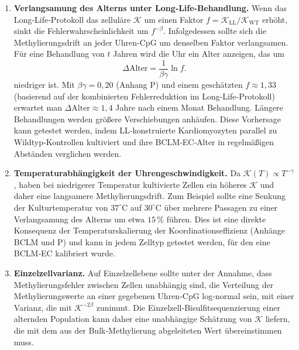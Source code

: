 \documentclass[12pt,a4paper]{article}
\newcommand{\REL}{\mathcal{K}}          %
\begin{document}
	\begin{enumerate}
		\item \textbf{Verlangsamung des Alterns unter Long‑Life‑Behandlung.}
		Wenn das Long‑Life‑Protokoll das zelluläre \(\REL\) um einen Faktor \(f = \REL_{\mathrm{LL}}/\REL_{\mathrm{WT}}\) erhöht, sinkt die Fehlerwahrscheinlichkeit um \(f^{-\beta}\). Infolgedessen sollte sich die Methylierungsdrift an jeder Uhren‑CpG um denselben Faktor verlangsamen. Für eine Behandlung von \(t\) Jahren wird die Uhr ein Alter anzeigen, das um
		\[
		\Delta\mathrm{Alter} = \frac{1}{\beta\gamma} \ln f.
		\]
		niedriger ist. Mit \(\beta\gamma = 0,20\) (Anhang P) und einem geschätzten \(f \approx 1,33\) (basierend auf der kombinierten Fehlerreduktion im Long‑Life‑Protokoll) erwartet man \(\Delta\mathrm{Alter} \approx 1,4\) Jahre nach einem Monat Behandlung. Längere Behandlungen werden größere Verschiebungen anhäufen. Diese Vorhersage kann getestet werden, indem LL‑konstruierte Kardiomyozyten parallel zu Wildtyp‑Kontrollen kultiviert und ihre BCLM‑EC‑Alter in regelmäßigen Abständen verglichen werden.
		
		\item \textbf{Temperaturabhängigkeit der Uhrengeschwindigkeit.}
		Da \(\REL(T) \propto T^{-\gamma}\), haben bei niedrigerer Temperatur kultivierte Zellen ein höheres \(\REL\) und daher eine langsamere Methylierungsdrift. Zum Beispiel sollte eine Senkung der Kulturtemperatur von \(37^\circ\text{C}\) auf \(30^\circ\text{C}\) über mehrere Passagen zu einer Verlangsamung des Alterns um etwa \(15\,\%\) führen. Dies ist eine direkte Konsequenz der Temperaturskalierung der Koordinationseffizienz (Anhänge BCLM und P) und kann in jedem Zelltyp getestet werden, für den eine BCLM‑EC kalibriert wurde.
		
		\item \textbf{Einzelzellvarianz.}
		Auf Einzelzellebene sollte unter der Annahme, dass Methylierungsfehler zwischen Zellen unabhängig sind, die Verteilung der Methylierungswerte an einer gegebenen Uhren‑CpG log‑normal sein, mit einer Varianz, die mit \(\REL^{-2\beta}\) zunimmt. Die Einzelzell‑Bisulfitsequenzierung einer alternden Population kann daher eine unabhängige Schätzung von \(\REL\) liefern, die mit dem aus der Bulk‑Methylierung abgeleiteten Wert übereinstimmen muss.
	\end{enumerate}
	
\end{document}
